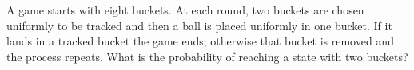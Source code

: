 A game starts with eight buckets. At each round, two buckets are chosen uniformly to be tracked and then a ball is placed uniformly in one bucket. If it lands in a tracked bucket the game ends; otherwise that bucket is removed and the process repeats. What is the probability of reaching a state with two buckets?

